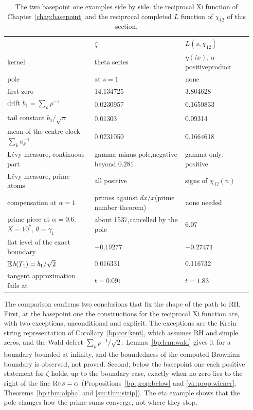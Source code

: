 \begin{table}[htbp]
\centering\small
\begin{tabular}{p{}p{}p{}}
\toprule
 & $\zeta$ & $L(s,\chi_{12})$\\
\midrule
kernel & theta series & $\eta(ix)$, a positive\newline product\\
pole & at $s=1$ & none\\
first zero & 14.134725 & 3.804628\\
drift $b_1=\sum_\rho\rho^{-1}$ & 0.0230957 & 0.1650833\\
tail constant $b_1/\sqrt\pi$ & 0.01303 & 0.09314\\
mean of the centre clock $\sum_ka_k^{-1}$ & 0.0231050 & 0.1664618\\
L\'evy measure, continuous part & gamma minus pole,\newline negative beyond $0.281$ & gamma only, positive\\
L\'evy measure, prime atoms & all positive & signs of $\chi_{12}(n)$\\
compensation at $\alpha=1$ & primes against $dx/x$\newline (prime number theorem) & none needed\\
prime piece at $\alpha=0.6$, $X=10^7$, $\theta=\gamma_1$ & about 1537,\newline cancelled by the pole & 6.07\\
flat level of the exact boundary & $-0.19277$ & $-0.27471$\\
$\mathbb{E}\,b(T_1)=b_1/\sqrt2$ & 0.016331 & 0.116732\\
tangent approximation fails at & $t=0.091$ & $t=1.83$\\
\bottomrule
\end{tabular}
\caption{The two basepoint one examples side by side: the reciprocal Xi function of Chapter~\ref{chap:basepoint} and the reciprocal completed $L$ function of $\chi_{12}$ of this section.}
\label{bp:eta:tab:cmp}
\end{table}

The comparison confirms two conclusions that fix the shape of the path to RH. First, at the basepoint one the constructions for the reciprocal Xi function are, with two exceptions, unconditional and explicit. The exceptions are the Krein string representation of Corollary~\ref{bp:cor:kent}, which assumes RH and simple zeros, and the Wald defect $\sum_\rho\rho^{-1}/\sqrt2$: Lemma~\ref{bp:lem:wald} gives it for a boundary bounded at infinity, and the boundedness of the computed Brownian boundary is observed, not proved. Second, below the basepoint one each positive statement for $\zeta$ holds, up to the boundary case, exactly when no zero lies to the right of the line $\operatorname{Re} s=\alpha$ (Propositions~\ref{bp:prop:below} and \ref{wr:prop:wiener}, Theorems~\ref{bp:thm:alpha} and \ref{sm:thm:strip}). The eta example shows that the pole changes how the prime sums converge, not where they stop.
